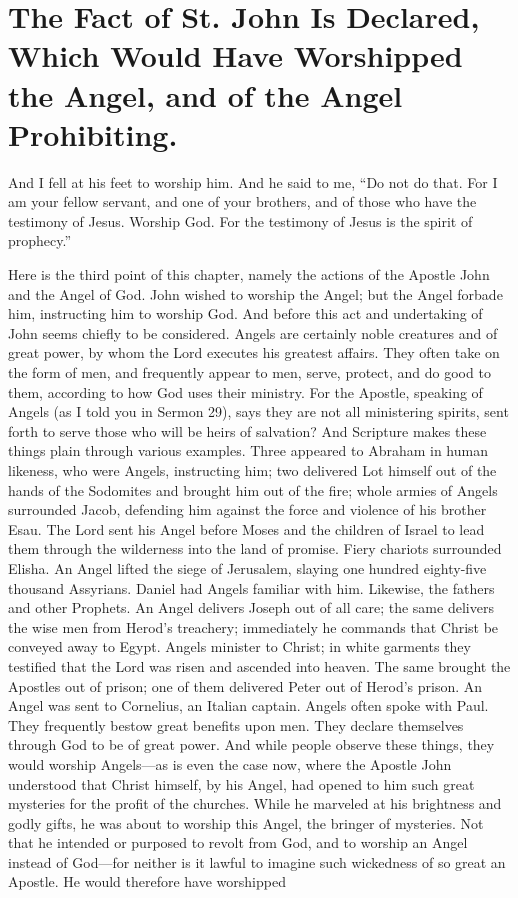 \chapter[Sermon 84. The Fact of St. John Is Declared, Which Would Have Worshipped the Angel, and of the Angel Prohibiting.]{The Fact of St. John Is Declared, Which Would Have Worshipped the Angel, and of the Angel Prohibiting.}
\label{sermon:084}

And I fell at his feet to worship him. And he said to me, “Do not do that. For I am your fellow servant, and one of your brothers, and of those who have the testimony of Jesus. Worship God. For the testimony of Jesus is the spirit of prophecy.”

Here is the third point of this chapter, namely the actions of the Apostle John and the Angel of God. John wished to worship the Angel; but the Angel forbade him, instructing him to worship God. And before this act and undertaking of John seems chiefly to be considered. Angels are certainly noble creatures and of great power, by whom the Lord executes his greatest affairs. They often take on the form of men, and frequently appear to men, serve, protect, and do good to them, according to how God uses their ministry. For the Apostle, speaking of Angels (as I told you in Sermon 29), says they are not all ministering spirits, sent forth to serve those who will be heirs of salvation? And Scripture makes these things plain through various examples. Three appeared to Abraham in human likeness, who were Angels, instructing him; two delivered Lot himself out of the hands of the Sodomites and brought him out of the fire; whole armies of Angels surrounded Jacob, defending him against the force and violence of his brother Esau. The Lord sent his Angel before Moses and the children of Israel to lead them through the wilderness into the land of promise. Fiery chariots surrounded Elisha. An Angel lifted the siege of Jerusalem, slaying one hundred eighty-five thousand Assyrians. Daniel had Angels familiar with him. Likewise, the fathers and other Prophets. An Angel delivers Joseph out of all care; the same delivers the wise men from Herod’s treachery; immediately he commands that Christ be conveyed away to Egypt. Angels minister to Christ; in white garments they testified that the Lord was risen and ascended into heaven. The same brought the Apostles out of prison; one of them delivered Peter out of Herod’s prison. An Angel was sent to Cornelius, an Italian captain. Angels often spoke with Paul. They frequently bestow great benefits upon men. They declare themselves through God to be of great power. And while people observe these things, they would worship Angels—as is even the case now, where the Apostle John understood that Christ himself, by his Angel, had opened to him such great mysteries for the profit of the churches. While he marveled at his brightness and godly gifts, he was about to worship this Angel, the bringer of mysteries. Not that he intended or purposed to revolt from God, and to worship an Angel instead of God—for neither is it lawful to imagine such wickedness of so great an Apostle. He would therefore have worshipped 
